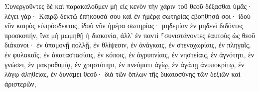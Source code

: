 \documentclass{openreader}
\begin{document}
Συνεργοῦντες δὲ καὶ παρακαλοῦμεν μὴ εἰς κενὸν τὴν χάριν τοῦ θεοῦ δέξασθαι ὑμᾶς· 
λέγει γάρ· Καιρῷ δεκτῷ ἐπήκουσά σου καὶ ἐν ἡμέρᾳ σωτηρίας ἐβοήθησά σοι· ἰδοὺ νῦν καιρὸς εὐπρόσδεκτος, ἰδοὺ νῦν ἡμέρα σωτηρίας· 
μηδεμίαν ἐν μηδενὶ διδόντες προσκοπήν, ἵνα μὴ μωμηθῇ ἡ διακονία, 
ἀλλ’ ἐν παντὶ ⸀συνιστάνοντες ἑαυτοὺς ὡς θεοῦ διάκονοι· ἐν ὑπομονῇ πολλῇ, ἐν θλίψεσιν, ἐν ἀνάγκαις, ἐν στενοχωρίαις, 
ἐν πληγαῖς, ἐν φυλακαῖς, ἐν ἀκαταστασίαις, ἐν κόποις, ἐν ἀγρυπνίαις, ἐν νηστείαις, 
ἐν ἁγνότητι, ἐν γνώσει, ἐν μακροθυμίᾳ, ἐν χρηστότητι, ἐν πνεύματι ἁγίῳ, ἐν ἀγάπῃ ἀνυποκρίτῳ, 
ἐν λόγῳ ἀληθείας, ἐν δυνάμει θεοῦ· διὰ τῶν ὅπλων τῆς δικαιοσύνης τῶν δεξιῶν καὶ ἀριστερῶν, 
\end{document}
